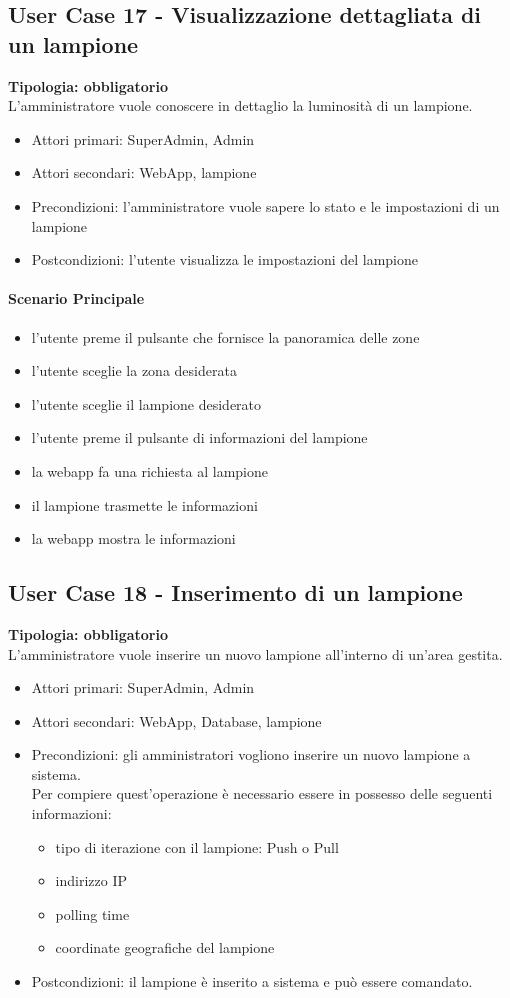 \documentclass[12pt]{article}
\begin{document}
\subsection{User Case 17 - Visualizzazione dettagliata di un lampione}
\textbf{Tipologia: obbligatorio} \\
L'amministratore vuole conoscere in dettaglio la luminosità di un lampione.
\begin{itemize}
	\item Attori primari: SuperAdmin, Admin
	\item Attori secondari: WebApp, lampione
	\item Precondizioni: l'amministratore vuole sapere lo stato e le impostazioni di un lampione
	\item Postcondizioni: l'utente visualizza le impostazioni del lampione
\end{itemize}
\paragraph{Scenario Principale}
\begin{itemize}
	\item l'utente preme il pulsante che fornisce la panoramica delle zone
	\item l'utente sceglie la zona desiderata
	\item l'utente sceglie il lampione desiderato
	\item l'utente preme il pulsante di informazioni del lampione
	\item la webapp fa una richiesta al lampione
	\item il lampione trasmette le informazioni
	\item la webapp mostra le informazioni
\end{itemize}

\subsection{User Case 18 - Inserimento di un lampione}
\textbf{Tipologia: obbligatorio}\\
L'amministratore vuole inserire un nuovo lampione all'interno di un'area gestita.
\begin{itemize}
	\item Attori primari: SuperAdmin, Admin
	\item Attori secondari: WebApp, Database, lampione
	\item Precondizioni: gli amministratori vogliono inserire un nuovo lampione a sistema.\\
	 Per compiere quest'operazione è necessario essere in possesso delle seguenti informazioni: 
	\begin{itemize}
		\item tipo di iterazione con il lampione: Push o Pull
		\item indirizzo IP
		\item polling time
		\item coordinate geografiche del lampione
	\end{itemize}
	\item Postcondizioni: il lampione è inserito a sistema e può essere comandato.
\end{itemize}
\end{document}
